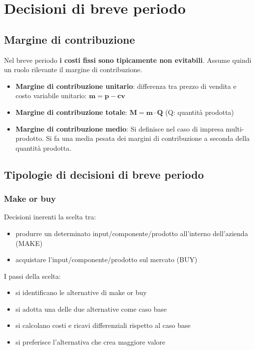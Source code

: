 \documentclass[../main.tex]{subfiles}
\begin{document}
\section{Decisioni di breve periodo}

\subsection{Margine di contribuzione}
Nel breve periodo \textbf{i costi fissi sono tipicamente non evitabili}. Assume quindi un ruolo rilevante il margine di contribuzione.

\begin{itemize}
    \item \textbf{Margine di contribuzione unitario}: differenza tra prezzo di vendita e costo variabile unitario: $\mathbf{m = p - cv}$
    \item \textbf{Margine di contribuzione totale}: $\mathbf{M = m \cdot Q}$ (Q: quantità prodotta)
    \item \textbf{Margine di contribuzione medio}: Si definisce nel caso di impresa multi-prodotto. Si fa una media pesata dei margini di contribuzione a seconda della quantità prodotta.
\end{itemize}

\subsection{Tipologie di decisioni di breve periodo}

\subsubsection{Make or buy}
Decisioni inerenti la scelta tra: 
\begin{itemize}
    \item produrre un determinato input/componente/prodotto all'interno dell'azienda (MAKE)
    \item acquistare l'input/componente/prodotto sul mercato (BUY)
\end{itemize}

I passi della scelta:
\begin{itemize}
    \item si identificano le alternative di make or buy
    \item si adotta una delle due alternative come caso base
    \item si calcolano costi e ricavi differenziali rispetto al caso base
    \item si preferisce l'alternativa che crea maggiore valore
\end{itemize}
\end{document}
